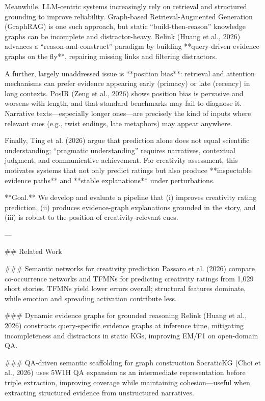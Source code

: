 Meanwhile, LLM-centric systems increasingly rely on retrieval and structured grounding to improve reliability. Graph-based Retrieval-Augmented Generation (GraphRAG) is one such approach, but static “build-then-reason” knowledge graphs can be incomplete and distractor-heavy. Relink (Huang et al., 2026) advances a “reason-and-construct” paradigm by building **query-driven evidence graphs on the fly**, repairing missing links and filtering distractors.

A further, largely unaddressed issue is **position bias**: retrieval and attention mechanisms can prefer evidence appearing early (primacy) or late (recency) in long contexts. PosIR (Zeng et al., 2026) shows position bias is pervasive and worsens with length, and that standard benchmarks may fail to diagnose it. Narrative texts—especially longer ones—are precisely the kind of inputs where relevant cues (e.g., twist endings, late metaphors) may appear anywhere.

Finally, Ting et al. (2026) argue that prediction alone does not equal scientific understanding; “pragmatic understanding” requires narratives, contextual judgment, and communicative achievement. For creativity assessment, this motivates systems that not only predict ratings but also produce **inspectable evidence paths** and **stable explanations** under perturbations.

**Goal.** We develop and evaluate a pipeline that (i) improves creativity rating prediction, (ii) produces evidence-graph explanations grounded in the story, and (iii) is robust to the position of creativity-relevant cues.

---

## Related Work  

### Semantic networks for creativity prediction  
Passaro et al. (2026) compare co-occurrence networks and TFMNs for predicting creativity ratings from 1,029 short stories. TFMNs yield lower errors overall; structural features dominate, while emotion and spreading activation contribute less.

### Dynamic evidence graphs for grounded reasoning  
Relink (Huang et al., 2026) constructs query-specific evidence graphs at inference time, mitigating incompleteness and distractors in static KGs, improving EM/F1 on open-domain QA.

### QA-driven semantic scaffolding for graph construction  
SocraticKG (Choi et al., 2026) uses 5W1H QA expansion as an intermediate representation before triple extraction, improving coverage while maintaining cohesion—useful when extracting structured evidence from unstructured narratives.

